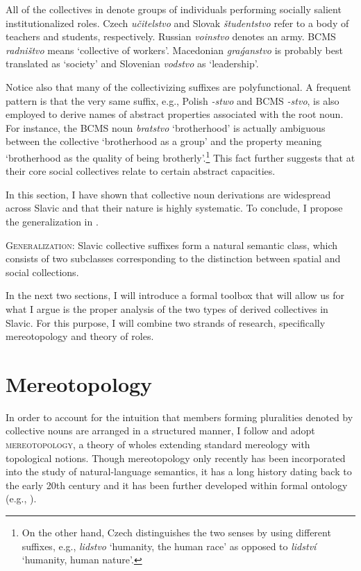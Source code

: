 \documentclass[output=paper]{langscibook}
\begin{document}
All of the collectives in  denote groups of individuals performing socially salient institutionalized roles. Czech \textit{učitelstvo} and Slovak \textit{študentstvo} refer to a body of teachers and students, respectively. Russian \textit{voinstvo} denotes an army. BCMS \textit{radništvo} means `collective of workers'. Macedonian \textit{gra{\'{g}}anstvo} is probably best translated as `society' and Slovenian \textit{vodstvo} as `leadership'.

Notice also that many of the collectivizing suffixes are polyfunctional. A frequent pattern is that the very same suffix, e.g., Polish \textit{-stwo} and BCMS \textit{-stvo}, is also employed to derive names of abstract properties associated with the root noun. For instance, the BCMS noun \textit{bratstvo} `brotherhood' is actually ambiguous between the collective `brotherhood as a group' and the property meaning `brotherhood as the quality of being brotherly'.\footnote{On the other hand, Czech distinguishes the two senses by using different suffixes, e.g., \textit{lidstvo} `humanity, the human race' as opposed to \textit{lidství} `humanity, human nature'.} This fact further suggests that at their core social collectives relate to certain abstract capacities.

In this section, I have shown that collective noun derivations are widespread across Slavic and that their nature is highly systematic. To conclude, I propose the generalization in .

\eanoraggedright \textsc{Generalization:} Slavic collective suffixes form a natural semantic class, which consists of two subclasses corresponding to the distinction between spatial and social collections.\label{wan:ex:generalization}
\z

\noindent In the next two sections, I will introduce a formal toolbox that will allow us for what I argue is the proper analysis of the two types of derived collectives in Slavic. For this purpose, I will combine two strands of research, specifically mereotopology and theory of roles.  

\section{Mereotopology}\label{wan:sec:mereotopology}

In order to account for the intuition that members forming pluralities denoted by collective nouns are arranged in a structured manner, I follow \citet{grimm2012number} and adopt \textsc{mereotopology}, a theory of wholes extending standard mereology with topological notions. Though mereotopology only recently has been incorporated into the study of natural-language semantics, it has a long history dating back to the early 20th century \citep{whitehead1920concept} and it has been further developed within formal ontology (e.g., \citealt{smith1996mereotopology,casati_varzi1999parts,varzi2007spatial}).
\end{document}
